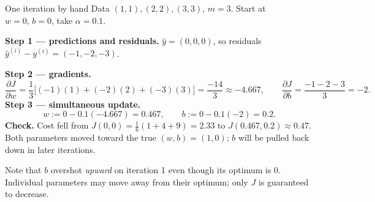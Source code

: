 \documentclass[aspectratio=169,11pt]{beamer}
\begin{document}
\begin{frame}{One iteration by hand}
  \small
  Data $(1,1),(2,2),(3,3)$, $m=3$. Start at $w=0,\,b=0$, take $\alpha=0.1$.
  \vspace{1mm}

  \textbf{Step 1 --- predictions and residuals.}
  $\hat y = (0,0,0)$, so residuals $\hat y^{(i)}-y^{(i)} = (-1,-2,-3)$.
  \vspace{1mm}

  \textbf{Step 2 --- gradients.}
  \[
    \frac{\partial J}{\partial w}=\frac{1}{3}\bigl[(-1)(1)+(-2)(2)+(-3)(3)\bigr]
      =\frac{-14}{3}\approx-4.667,
    \qquad
    \frac{\partial J}{\partial b}=\frac{-1-2-3}{3}=-2.
  \]
  \textbf{Step 3 --- simultaneous update.}
  \[
    w := 0 - 0.1(-4.667) = 0.467,\qquad b := 0 - 0.1(-2) = 0.2 .
  \]
  \vspace{1mm}
  \textbf{Check.} Cost fell from $J(0,0)=\tfrac{1}{6}(1+4+9)=2.33$ to
  $J(0.467,0.2)\approx 0.47$. Both parameters moved toward the true
  $(w,b)=(1,0)$; $b$ will be pulled back down in later iterations.
  \vspace{1mm}
  \begin{pitfall}
    Note that $b$ overshot \emph{upward} on iteration 1 even though its optimum is
    $0$. Individual parameters may move away from their optimum; only $J$ is
    guaranteed to decrease.
  \end{pitfall}
\end{frame}
\end{document}
